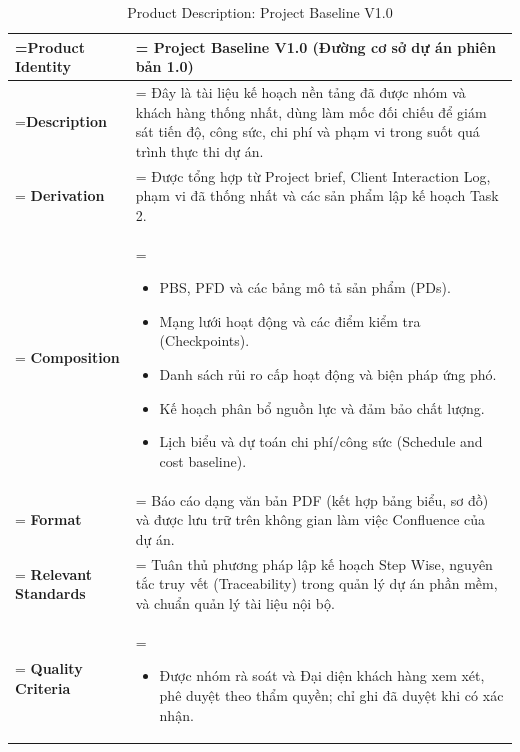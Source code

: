 \documentclass{article}
\begin{document}
\clearpage
\begin{table}[H]
    \centering
    \caption{Product Description: Project Baseline V1.0}
    \renewcommand{\arraystretch}{1.5}
    \begin{tabularx}{\textwidth}{|>{\hsize=0.5\hsize\linewidth=\hsize\bfseries}X|>{\hsize=1.5\hsize\linewidth=\hsize}X|}
        \hline
        Product Identity & \textbf{Project Baseline V1.0} (Đường cơ sở dự án phiên bản 1.0) \\
        \hline
        Description & Đây là tài liệu kế hoạch nền tảng đã được nhóm và khách hàng thống nhất, dùng làm mốc đối chiếu để giám sát tiến độ, công sức, chi phí và phạm vi trong suốt quá trình thực thi dự án. \\
        \hline
        Derivation & Được tổng hợp từ Project brief, Client Interaction Log, phạm vi đã thống nhất và các sản phẩm lập kế hoạch Task 2. \\
        \hline
        Composition & 
        \vspace{-0.8em}
        \begin{itemize}[leftmargin=*, nosep]
            \item PBS, PFD và các bảng mô tả sản phẩm (PDs).
            \item Mạng lưới hoạt động và các điểm kiểm tra (Checkpoints).
            \item Danh sách rủi ro cấp hoạt động và biện pháp ứng phó.
            \item Kế hoạch phân bổ nguồn lực và đảm bảo chất lượng.
            \item Lịch biểu và dự toán chi phí/công sức (Schedule and cost baseline).
        \end{itemize}
        \vspace{-1em} \\
        \hline
        Format & Báo cáo dạng văn bản PDF (kết hợp bảng biểu, sơ đồ) và được lưu trữ trên không gian làm việc Confluence của dự án. \\
        \hline
        Relevant Standards & Tuân thủ phương pháp lập kế hoạch Step Wise, nguyên tắc truy vết (Traceability) trong quản lý dự án phần mềm, và chuẩn quản lý tài liệu nội bộ. \\
        \hline
        Quality Criteria & 
        \vspace{-0.8em}
        \begin{itemize}[leftmargin=*, nosep]
            \item Được nhóm rà soát và Đại diện khách hàng xem xét, phê duyệt theo thẩm quyền; chỉ ghi đã duyệt khi có xác nhận.

\end{itemize}
\end{tabularx}
\end{table}
\end{document}
